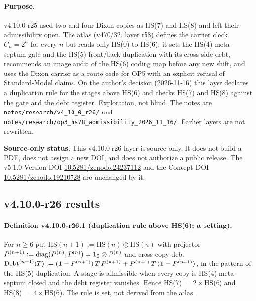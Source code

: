 \paragraph{Purpose.}
v4.10.0-r25 used two and four Dixon copies as HS(7) and HS(8) and left their admissibility open.  The atlas (v470/32, layer r58) defines
the carrier clock \(C_n=2^n\) for every \(n\) but reads only HS(0) to HS(6); it sets the HS(4) meta-septum gate and the HS(5) front/back
duplication with its cross-side debt, recommends an image audit of the HS(6) coding map before any new shift, and uses the Dixon carrier
as a route code for OP5 with an explicit refusal of Standard-Model claims.  On the author's decision (2026-11-16) this layer declares a
duplication rule for the stages above HS(6) and checks HS(7) and HS(8) against the gate and the debt register.  Exploration, not blind.
The notes are \texttt{notes/\allowbreak research/\allowbreak v4\_10\_0\_r26/} and
\texttt{notes/\allowbreak research/\allowbreak op3\_hs78\_admissibility\_2026\_11\_16/}.  Earlier layers are not rewritten.

\noindent\textbf{Source-only status.}
This v4.10.0-r26 layer is source-only.  It does not build a PDF, does not assign a new DOI,
and does not authorize a public release.  The v5.1.0 Version DOI
\href{https://doi.org/10.5281/zenodo.24237112}{10.5281/zenodo.24237112} and the Concept DOI
\href{https://doi.org/10.5281/zenodo.19210728}{10.5281/zenodo.19210728} are unchanged by it.

\subsection*{v4.10.0-r26 results}
\label{subsec:v4100-r26-results}

\paragraph{Definition v4.10.0-r26.1 (duplication rule above HS(6); a setting).}
For \(n\ge6\) put \(\mathrm{HS}(n+1):=\mathrm{HS}(n)\oplus\mathrm{HS}(n)\) with projector \(P^{(n+1)}:=\mathrm{diag}(P^{(n)},P^{(n)})=\mathbf 1_2\otimes P^{(n)}\) and cross-copy
debt \(\mathrm{Debt}^{(n+1)}(T):=(\mathbf 1-P^{(n+1)})\,T\,P^{(n+1)}+P^{(n+1)}\,T\,(\mathbf 1-P^{(n+1)})\), in the pattern of the HS(5) duplication.  A stage is
admissible when every copy is HS(4) meta-septum closed and the debt register vanishes.  Hence HS(7) \(=2\times\)HS(6) and HS(8) \(=4\times\)HS(6).
The rule is set, not derived from the atlas.

